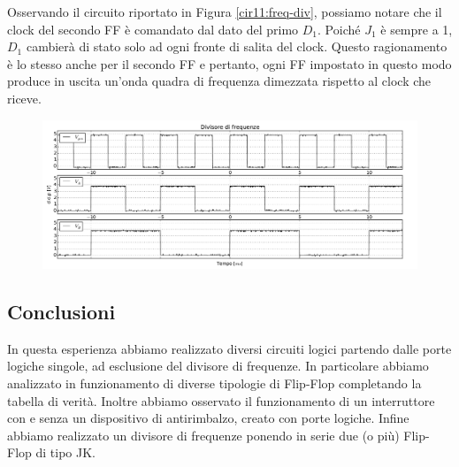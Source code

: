 Osservando il circuito riportato in Figura \ref{cir11:freq-div}, possiamo notare che il clock del secondo FF è comandato dal dato del primo $D_1$.
Poiché $J_1$ è sempre a 1, $D_1$ cambierà di stato solo ad ogni fronte di salita del clock.
Questo ragionamento è lo stesso anche per il secondo FF e pertanto, ogni FF impostato in questo modo produce in uscita un'onda quadra di frequenza dimezzata rispetto al clock che riceve.

\begin{figure}[htpc]
\centering
	\includegraphics[width=.98\textwidth]{../E11/latex/gfreq.pdf}
	\caption{}
	\label{gr11:freq}
\end{figure}

\subsection*{Conclusioni}

In questa esperienza abbiamo realizzato diversi circuiti logici partendo dalle porte logiche singole, ad esclusione del divisore di frequenze.
In particolare abbiamo analizzato in funzionamento di diverse tipologie di Flip-Flop completando la tabella di verità.
Inoltre abbiamo osservato il funzionamento di un interruttore con e senza un dispositivo di antirimbalzo, creato con porte logiche.
Infine abbiamo realizzato un divisore di frequenze ponendo in serie due (o più) Flip-Flop di tipo JK.